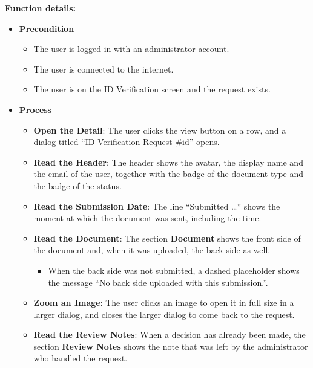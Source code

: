 \textbf{Function details:}
\begin{itemize}[leftmargin=1.6em,topsep=4pt,itemsep=3pt,parsep=0pt,label=$\bullet$]
    \item \textbf{Precondition}
        \begin{itemize}[leftmargin=2.2em,topsep=2pt,itemsep=3pt,parsep=0pt,label=$\circ$]
            \item The user is logged in with an administrator account.
            \item The user is connected to the internet.
            \item The user is on the ID Verification screen and the request exists.
        \end{itemize}
    \item \textbf{Process}
        \begin{itemize}[leftmargin=2.2em,topsep=2pt,itemsep=3pt,parsep=0pt,label=$\circ$]
            \item \textbf{Open the Detail}: The user clicks the view button on a row, and a dialog titled ``ID Verification Request \#id'' opens.
            \item \textbf{Read the Header}: The header shows the avatar, the display name and the email of the user, together with the badge of the document type and the badge of the status.
            \item \textbf{Read the Submission Date}: The line ``Submitted \dots'' shows the moment at which the document was sent, including the time.
            \item \textbf{Read the Document}: The section \textbf{Document} shows the front side of the document and, when it was uploaded, the back side as well.
                \begin{itemize}[leftmargin=2.2em,topsep=2pt,itemsep=3pt,parsep=0pt,label=$\blacksquare$]
                    \item When the back side was not submitted, a dashed placeholder shows the message ``No back side uploaded with this submission.''.
                \end{itemize}
            \item \textbf{Zoom an Image}: The user clicks an image to open it in full size in a larger dialog, and closes the larger dialog to come back to the request.
            \item \textbf{Read the Review Notes}: When a decision has already been made, the section \textbf{Review Notes} shows the note that was left by the administrator who handled the request.

\end{itemize}
\end{itemize}
